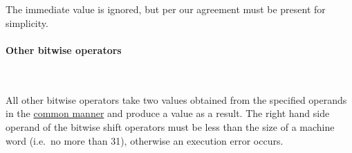\paragraph{}\

The immediate value is ignored, but per our agreement must be present for simplicity.

\vspace{-0.35cm}
\paragraph{Other bitwise operators}\

All other bitwise operators take two  values obtained from
the specified operands in the \hyperlink{types:twos_complement}{common manner}
and produce a  value as a result.
The right hand side operand of the bitwise shift operators must be less than
the size of a machine word (i.e.\ no more than 31), otherwise an execution
error occurs.
